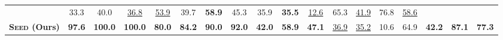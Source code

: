\begin{table}[ht!]
{\begin{tabular}{l ccccccc cccccccc cc}
        & 33.3 & 40.0
        & \cellcolor{secondcolor}\underline{36.8}
        & \cellcolor{secondcolor}\underline{53.9}
        & 39.7
        & \cellcolor{topcolor}\textbf{58.9}
        & 45.3 & 35.9
        & \cellcolor{topcolor}\textbf{35.5}
        & \cellcolor{secondcolor}\underline{12.6}
        & 65.3
        & \cellcolor{secondcolor}\underline{41.9}
        & 76.8
        & \cellcolor{secondcolor}\underline{58.6}
        \\
    \textbf{\textsc{Seed} (Ours)}
        & \cellcolor{topcolor}\textbf{97.6}
        & \cellcolor{topcolor}\textbf{100.0}
        & \cellcolor{topcolor}\textbf{100.0}
        & \cellcolor{topcolor}\textbf{80.0}
        & \cellcolor{topcolor}\textbf{84.2}
        & \cellcolor{topcolor}\textbf{90.0}
        & \cellcolor{topcolor}\textbf{92.0}
        & \cellcolor{topcolor}\textbf{42.0}
        & \cellcolor{topcolor}\textbf{58.9}
        & \cellcolor{topcolor}\textbf{47.1}
        & \cellcolor{secondcolor}\underline{36.9}
        & \cellcolor{secondcolor}\underline{35.2}
        & 10.6 & 64.9
        & \cellcolor{topcolor}\textbf{42.2}
        & \cellcolor{topcolor}\textbf{87.1}
        & \cellcolor{topcolor}\textbf{77.3}
        \\

    \bottomrule
    \end{tabular}
    }
\end{table}